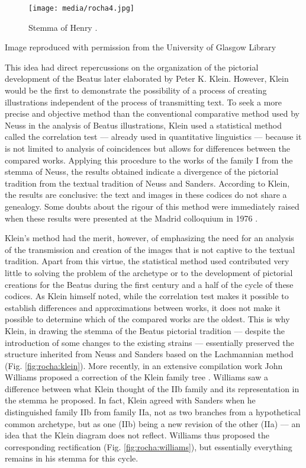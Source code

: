 \documentclass{article}
\begin{document}
\begin{figure}[H]
    \centering
    \texttt{[image: media/rocha4.jpg]}
    \caption{Stemma of Henry \citet{sanders_beati_1930}.}
    \label{fig:rocha:sanders}
\end{figure}


 Image reproduced with permission from the University of Glasgow Library 


 
This idea had direct repercussions on the organization of the pictorial
development of the Beatus later elaborated by Peter K. Klein. However,
Klein would be the first to demonstrate the possibility of a process of
creating illustrations independent of the process of transmitting text.
To seek a more precise and objective method than the conventional
comparative method used by Neuss in the analysis of Beatus
illustrations, Klein used a statistical method called the correlation
test –– already used in quantitative linguistics –– because it is not
limited to analysis of coincidences but allows for differences between
the compared works. Applying this procedure to the works of the family I
from the stemma of Neuss, the results obtained indicate a
divergence of the pictorial tradition from the textual tradition of
Neuss and Sanders. According to Klein, the results are conclusive: the
text and images in these codices do not share a genealogy. Some doubts
about the rigour of this method were immediately raised when these
results were presented at the Madrid colloquium in 1976 \citep[2:107--115]{noauthor_actas_1978}.

Klein's method had the merit, however, of emphasizing the need for an
analysis of the transmission and creation of the images that is not
captive to the textual tradition. Apart from this virtue, the
statistical method used contributed very little to solving the problem
of the archetype or to the development of pictorial creations for the
Beatus during the first century and a half of the cycle of these
codices. As Klein himself noted, while the correlation test makes it
possible to establish differences and approximations between works, it
does not make it possible to determine which of the compared works are
the oldest. This is why Klein, in drawing the stemma of the
Beatus pictorial tradition –– despite the introduction of some changes
to the existing strains ––  essentially preserved the structure
inherited from Neuss and Sanders based on the Lachmannian method (Fig. \ref{fig:rocha:klein}). More recently, in an extensive compilation work John Williams
proposed a correction of the Klein family tree \citep[1:26]{williams_illustrated_1994}. Williams saw a difference between what Klein thought of the IIb
family and its representation in the stemma he proposed. In fact,
Klein agreed with Sanders when he distinguished family IIb from family
IIa, not as two branches from a hypothetical common archetype, but as
one (IIb) being a new revision of the other (IIa) ––  an idea that the
Klein diagram does not reflect. Williams thus proposed the corresponding
rectification (Fig. \ref{fig:rocha:williams}), but essentially everything remains in his
stemma for this cycle.
\end{document}
